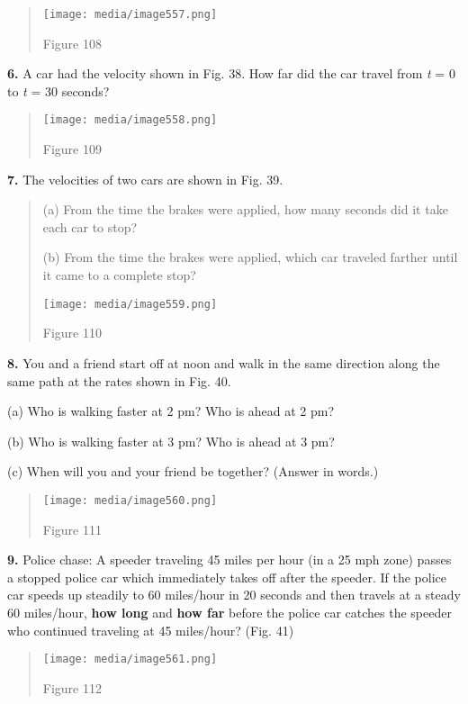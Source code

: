 \begin{quote}
\texttt{[image: media/image557.png]}

Figure 108
\end{quote}

\textbf{6.} A car had the velocity shown in Fig. 38. How far did the car
travel from \emph{t} = 0 to \emph{t} = 30 seconds?

\begin{quote}
\texttt{[image: media/image558.png]}

Figure 109
\end{quote}

\textbf{7.} The velocities of two cars are shown in Fig. 39.

\begin{quote}
(a) From the time the brakes were applied, how many seconds did it take
each car to stop?

(b) From the time the brakes were applied, which car traveled farther
until it came to a complete stop?

\texttt{[image: media/image559.png]}

Figure 110
\end{quote}

\textbf{8.} You and a friend start off at noon and walk in the same
direction along the same path at the rates shown in Fig. 40.

(a) Who is walking faster at 2 pm? Who is ahead at 2 pm?

(b) Who is walking faster at 3 pm? Who is ahead at 3 pm?

(c) When will you and your friend be together? (Answer in words.)

\begin{quote}
\texttt{[image: media/image560.png]}

Figure 111
\end{quote}

\textbf{9.} Police chase: A speeder traveling 45 miles per hour (in a 25
mph zone) passes a stopped police car which immediately takes off after
the speeder. If the police car speeds up steadily to 60 miles/hour in 20
seconds and then travels at a steady 60 miles/hour, \textbf{how long}
and \textbf{how far} before the police car catches the speeder who
continued traveling at 45 miles/hour? (Fig. 41)

\begin{quote}
\texttt{[image: media/image561.png]}

Figure 112
\end{quote}

